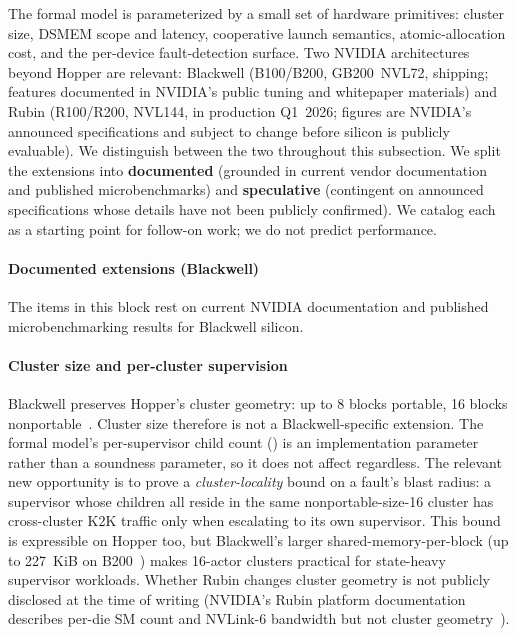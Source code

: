 The formal model is parameterized by a small set of hardware
primitives: cluster size, DSMEM scope and latency, cooperative
launch semantics, atomic-allocation cost, and the per-device
fault-detection surface.  Two NVIDIA architectures beyond Hopper
are relevant: Blackwell (B100/B200, GB200~NVL72, shipping; features
documented in NVIDIA's public tuning and whitepaper materials) and
Rubin (R100/R200, NVL144, in production Q1~2026; figures are
NVIDIA's announced specifications and subject to change before
silicon is publicly evaluable).  We distinguish between the two
throughout this subsection.  We split the extensions into
\textbf{documented} (grounded in current vendor documentation and
published microbenchmarks) and \textbf{speculative} (contingent on
announced specifications whose details have not been publicly
confirmed).  We catalog each as a starting point for follow-on
work; we do not predict performance.

\paragraph{Documented extensions (Blackwell)}
The items in this block rest on current NVIDIA documentation and
published microbenchmarking results for Blackwell silicon.

\paragraph{Cluster size and per-cluster supervision}
Blackwell preserves Hopper's cluster geometry: up to 8 blocks
portable, 16 blocks
nonportable~\citep{nvidia2024blackwell-tuning,colfax2024clusters}.
Cluster size therefore is not a Blackwell-specific extension.  The
formal model's per-supervisor child count
() is an implementation parameter
rather than a soundness parameter, so it does not affect
 regardless.  The relevant new
opportunity is to prove a \emph{cluster-locality} bound on a
fault's blast radius: a supervisor whose children all reside in
the same nonportable-size-16 cluster has cross-cluster K2K traffic
only when escalating to its own supervisor.  This bound is
expressible on Hopper too, but Blackwell's larger
shared-memory-per-block (up to 227~KiB on
B200~\citep{nvidia2024blackwell-tuning}) makes 16-actor clusters
practical for state-heavy supervisor workloads.  Whether Rubin
changes cluster geometry is not publicly disclosed at the time of
writing (NVIDIA's Rubin platform documentation describes per-die
SM count and NVLink-6 bandwidth but not cluster
geometry~\citep{nvidia2025rubin}).

